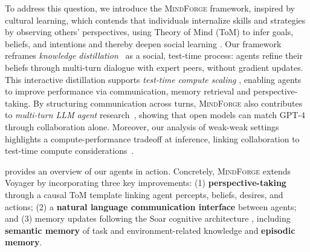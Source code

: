 \documentclass{article}
\newcommand{\collabvoyager}[0]{\mbox{\textsc{MindForge}}\xspace}
\begin{document}
To address this question, we introduce the \collabvoyager framework, inspired by cultural learning, which contends that individuals internalize skills and strategies by observing others' perspectives, using Theory of Mind (ToM) to infer goals, beliefs, and intentions and thereby deepen social learning \citep{tomasello1993cultural, tomasello2016cultural, premack1978does, baron1999evolution, devaine2014social}.
Our framework reframes \textit{knowledge distillation}~\citep{hinton2015distilling} as a social, test-time process: agents refine their beliefs through multi-turn dialogue with expert peers, without gradient updates. This interactive distillation supports \textit{test-time compute scaling} \citep{snell2024scaling}, enabling agents to improve performance via communication, memory retrieval and perspective-taking. By structuring communication across turns, \collabvoyager also contributes to \textit{multi-turn LLM agent} research~\citep{zhang2023building, du2023improving}, showing that open models can match GPT-4 through collaboration alone. Moreover, our analysis of weak-weak settings highlights a compute-performance tradeoff at inference, linking collaboration to test-time compute considerations~\citep{ snell2024scaling}.

 provides an overview of our agents in action. Concretely, \collabvoyager extends Voyager by incorporating three key improvements:  (1) \textbf{perspective-taking} through a causal ToM template \cite{gandhi2024understanding} linking agent percepts, beliefs, desires, and actions; (2)  a \textbf{natural language communication interface} between agents; and (3) memory updates following the Soar cognitive architecture \cite{laird2019soar}, including \textbf{semantic memory} of task and environment-related knowledge and \textbf{episodic memory}.  
\end{document}
